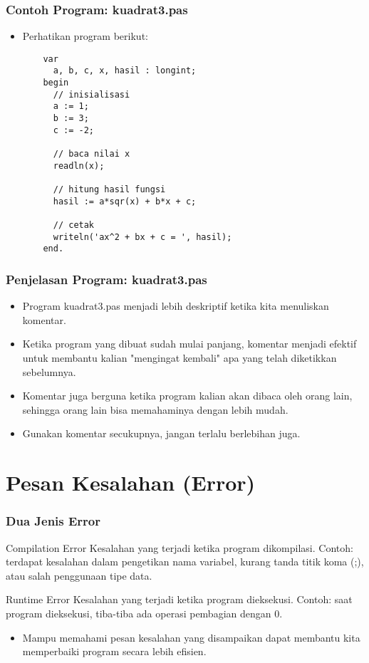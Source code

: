\documentclass{beamer}
\begin{document}
\begin{frame} [fragile]
\frametitle{Contoh Program: kuadrat3.pas}
\begin{itemize}
  \item Perhatikan program berikut:
  \begin{lstlisting}
    var
      a, b, c, x, hasil : longint;
    begin
      // inisialisasi
      a := 1;
      b := 3;
      c := -2;

      // baca nilai x
      readln(x);

      // hitung hasil fungsi
      hasil := a*sqr(x) + b*x + c;

      // cetak
      writeln('ax^2 + bx + c = ', hasil);
    end.
  \end{lstlisting}
\end{itemize}
\end{frame}

\begin{frame}
\frametitle{Penjelasan Program: kuadrat3.pas}
\begin{itemize}
  \item Program kuadrat3.pas menjadi lebih deskriptif ketika kita menuliskan komentar.
  \item Ketika program yang dibuat sudah mulai panjang, komentar menjadi efektif untuk membantu kalian "mengingat kembali" apa yang telah diketikkan sebelumnya.
  \item Komentar juga berguna ketika program kalian akan dibaca oleh orang lain, sehingga orang lain bisa memahaminya dengan lebih mudah.
  \item Gunakan komentar secukupnya, jangan terlalu berlebihan juga.
\end{itemize}
\end{frame}

\section{Pesan Kesalahan (Error)}
\frame{\sectionpage}

\begin{frame}
\frametitle{Dua Jenis Error}
\begin{block}{Compilation Error}
  Kesalahan yang terjadi ketika program dikompilasi.\newline
  Contoh: terdapat kesalahan dalam pengetikan nama variabel, kurang tanda titik koma (;), atau salah penggunaan tipe data.
\end{block}
\begin{block}{Runtime Error}
  Kesalahan yang terjadi ketika program dieksekusi.\newline
  Contoh: saat program dieksekusi, tiba-tiba ada operasi pembagian dengan 0.
\end{block}

\begin{itemize}
  \item Mampu memahami pesan kesalahan yang disampaikan dapat membantu kita memperbaiki program secara lebih efisien.
\end{itemize}
\end{frame}
\end{document}
